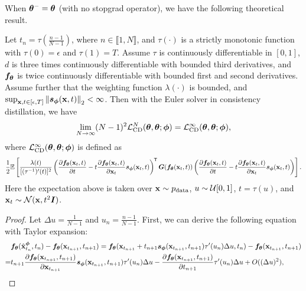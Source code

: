 \begin{appendices}
When ${\bm{\theta}}^{-}={\bm{\theta}}$ (with no stopgrad operator), we have the following theoretical result.
\begin{theorem}\label{thm:ctcd1}
    Let $t_n = \tau(\frac{n-1}{N-1})$, where $n \in \llbracket 1, N \rrbracket$, and $\tau(\cdot)$ is a strictly monotonic function with $\tau(0) = \epsilon$ and $\tau(1) = T$. Assume $\tau$ is continuously differentiable in $[0,1]$, $d$ is three times continuously differentiable with bounded third derivatives, and ${\bm{f}}_{{\bm{\theta}}}$ is twice continuously differentiable with bounded first and second derivatives. Assume further that the weighting function $\lambda(\cdot)$ is bounded, and $\sup_{{\mathbf{x}},t\in[\epsilon, T]}\left\lVert{\bm{s}}_{\bm{\phi}}({\mathbf{x}}, t)\right\rVert_2 < \infty$. Then with the Euler solver in consistency distillation, we have
    \begin{align}
        \lim_{N \to \infty} (N-1)^2 \mathcal{L}_\text{CD}^N({\bm{\theta}}, {\bm{\theta}}; {\bm{\phi}}) = \mathcal{L}_\text{CD}^\infty({\bm{\theta}}, {\bm{\theta}}; {\bm{\phi}}) \label{eq:ctcd_obj},
    \end{align}
    where $\mathcal{L}_\text{CD}^{\infty} ({\bm{\theta}}, {\bm{\theta}}; {\bm{\phi}})$ is defined as
    \begin{align}
        \frac{1}{2} \mathbb{E}\left[\frac{\lambda(t)}{[(\tau^{-1})'(t)]^2} \left(\frac{\partial {\bm{f}}_{\bm{\theta}}({\mathbf{x}}_t, t)}{\partial t} - t \frac{\partial {\bm{f}}_{\bm{\theta}}({\mathbf{x}}_t, t)}{\partial {\mathbf{x}}_t} {\bm{s}}_{\bm{\phi}}({\mathbf{x}}_{t}, t)\right)^{\mkern-1.5mu\mathsf{T}} {\bm{G}}({\bm{f}}_{\bm{\theta}}({\mathbf{x}}_t, t)) \left(\frac{\partial {\bm{f}}_{\bm{\theta}}({\mathbf{x}}_t, t)}{\partial t} - t \frac{\partial {\bm{f}}_{\bm{\theta}}({\mathbf{x}}_t, t)}{\partial {\mathbf{x}}_t} {\bm{s}}_{\bm{\phi}}({\mathbf{x}}_{t}, t)\right)\right].
    \end{align}
    Here the expectation above is taken over ${\mathbf{x}} \sim p_\text{data}$, $u \sim \mathcal{U}[0, 1]$, $t = \tau(u)$, and ${\mathbf{x}}_t \sim \mathcal{N}({\mathbf{x}}, t^2{\bm{I}})$.
\end{theorem}
\begin{proof}
    Let $\Delta u = \frac{1}{N-1}$ and $u_n = \frac{n-1}{N-1}$. First, we can derive the following equation with Taylor expansion:
    \begin{align}
        &\vf_\vtheta(\hat{\rvx}_{t_n}^\vphi, t_n) - \vf_\vtheta(\rvx_{t_{n+1}}, t_{n+1}) = \vf_{\vtheta}(\rvx_{t_{n+1}} +  t_{n+1} \vs_\vphi(\rvx_{t_{n+1}}, t_{n+1})\tau'(u_{n})\Delta u, t_n) - \vf_\vtheta(\rvx_{t_{n+1}}, t_{n+1})\notag \\
        =& t_{n+1} \frac{\partial \vf_\vtheta(\rvx_{t_{n+1}}, t_{n+1})}{\partial \rvx_{t_{n+1}}}\vs_\vphi(\rvx_{t_{n+1}}, t_{n+1})\tau'(u_{n})\Delta u  - \frac{\partial \vf_\vtheta(\rvx_{t_{n+1}}, t_{n+1})}{\partial t_{n+1}}\tau'(u_{n})\Delta u  + O((\Delta u)^2),\label{eq:ctcd1}

\end{align}
\end{proof}
\end{appendices}
